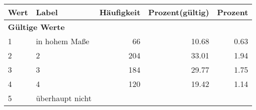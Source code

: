      \begin{longtable}{lXrrr}
     \toprule
     \textbf{Wert} & \textbf{Label} & \textbf{Häufigkeit} & \textbf{Prozent(gültig)} & \textbf{Prozent} \\
     \endhead
     \midrule
     \multicolumn{5}{l}{\textbf{Gültige Werte}}\\

     1 &
     \multicolumn{1}{X}{ in hohem Maße   } &


       \num{66} &
       \num[round-mode=places,round-precision=2]{10.68} &
         \num[round-mode=places,round-precision=2]{0.63} \\

     2 &
     \multicolumn{1}{X}{ 2   } &


       \num{204} &
       \num[round-mode=places,round-precision=2]{33.01} &
         \num[round-mode=places,round-precision=2]{1.94} \\

     3 &
     \multicolumn{1}{X}{ 3   } &


       \num{184} &
       \num[round-mode=places,round-precision=2]{29.77} &
         \num[round-mode=places,round-precision=2]{1.75} \\

     4 &
     \multicolumn{1}{X}{ 4   } &


       \num{120} &
       \num[round-mode=places,round-precision=2]{19.42} &
         \num[round-mode=places,round-precision=2]{1.14} \\

     5 &
     \multicolumn{1}{X}{ überhaupt nicht   } &



\end{longtable}
